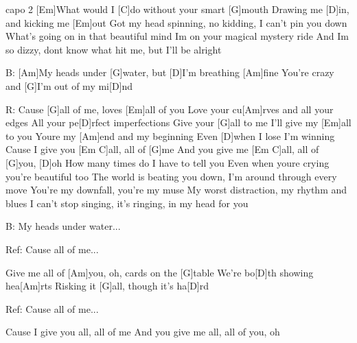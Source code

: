 \hfill capo 2
[Em]What would I [C]do without your smart [G]mouth
Drawing me [D]in, and kicking me [Em]out
Got my head spinning, no kidding, 
I can't pin you down
What's going on in that beautiful mind
Im on your magical mystery ride
And Im so dizzy, dont know what hit me, 
but I'll be alright

B: [Am]My heads under [G]water, but [D]I'm breathing [Am]fine
You're crazy and [G]I'm out of my mi[D]nd

R: Cause [G]all of me, loves [Em]all of you
Love your cu[Am]rves and all your edges
All your pe[D]rfect imperfections
Give your [G]all to me
I'll give my [Em]all to you
Youre my [Am]end and my beginning
Even [D]when I lose I'm winning
Cause I give you [Em C]all, all of [G]me
And you give me [Em C]all, all of [G]you, [D]oh
\columnbreak
How many times do I have to tell you
Even when youre crying you're beautiful too
The world is beating you down, I'm around through every move
You're my downfall, you're my muse
My worst distraction, my rhythm and blues
I can't stop singing, it's ringing, in my head for you

B: My heads under water...

Ref: Cause all of me...

Give me all of [Am]you, oh, cards on the [G]table
We're bo[D]th showing hea[Am]rts
Risking it [G]all, though it's ha[D]rd


Ref: Cause all of me...

Cause I give you all, all of me
And you give me all, all of you, oh

